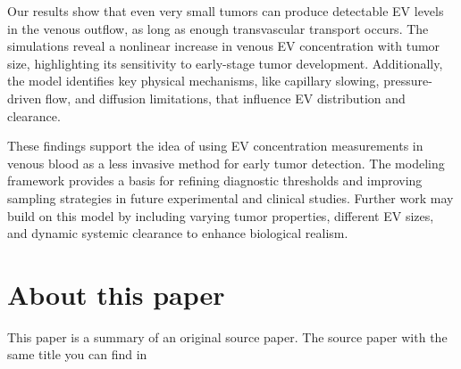 \documentclass[sigconf]{acmart}
\begin{document}
Our results show that even very small tumors can produce detectable EV levels in the venous outflow, as long as enough transvascular transport occurs. The simulations reveal a nonlinear increase in venous EV concentration with tumor size, highlighting its sensitivity to early-stage tumor development. Additionally, the model identifies key physical mechanisms, like capillary slowing, pressure-driven flow, and diffusion limitations, that influence EV distribution and clearance.

These findings support the idea of using EV concentration measurements in venous blood as a less invasive method for early tumor detection. The modeling framework provides a basis for refining diagnostic thresholds and improving sampling strategies in future experimental and clinical studies. Further work may build on this model by including varying tumor properties, different EV sizes, and dynamic systemic clearance to enhance biological realism.





\appendix

\section{About this paper}
This paper is a summary of an original source paper. The source paper with the same title you can find in \cite{Zoofaghari_2023}
\end{document}
